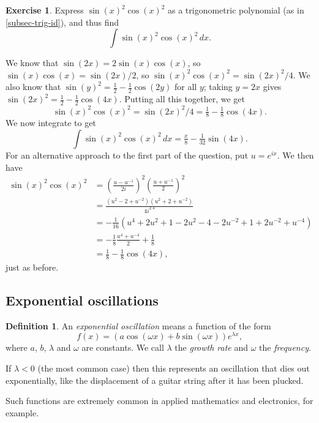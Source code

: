 \documentclass[a4paper]{book}
\newcommand{\PURPLE}[1]{{\color{purple}#1}}
\newcommand{\lm}        {\lambda}
\newcommand{\om}        {\omega}
\renewcommand{\:}{\colon}
\newcommand{\DEFN}[1]{\PURPLE{\emph{#1}}}
\theoremstyle{definition}
\newtheorem{definition}[theorem]{Definition}
\newtheorem{exercise}[theorem]{Exercise}
\renewenvironment{solution}{\SolutionInline}{\endSolutionInline}
\begin{document}
\begin{exercise}
 Express $\sin(x)^2\cos(x)^2$ as a trigonometric polynomial (as in
 \autoref{subsec-trig-id}), and thus find
 \[ \int \sin(x)^2 \cos(x)^2 \, dx. \]
\end{exercise}
\begin{solution}
 We know that $\sin(2x)=2\sin(x)\cos(x)$, so
 $\sin(x)\cos(x)=\sin(2x)/2$, so $\sin(x)^2\cos(x)^2=\sin(2x)^2/4$.
 We also know that $\sin(y)^2=\frac{1}{2}-\frac{1}{2}\cos(2y)$ for all
 $y$; taking $y=2x$ gives
 $\sin(2x)^2=\frac{1}{2}-\frac{1}{2}\cos(4x)$.  Putting all this
 together, we get
 \[ \sin(x)^2\cos(x)^2=\sin(2x)^2/4 = 
     \tfrac{1}{8}-\tfrac{1}{8}\cos(4x).
 \]
 We now integrate to get 
 \[ \int \sin(x)^2\cos(x)^2 \, dx =
     \tfrac{x}{8}-\tfrac{1}{32}\sin(4x).
 \]
 For an alternative approach to the first part of the question, put
 $u=e^{ix}$.  We then have
 \begin{align*}
  \sin(x)^2\cos(x)^2 &= \left(\frac{u-u^{-1}}{2i}\right)^2 
                         \left(\frac{u+u^{-1}}{2}\right)^2 \\
   &= \frac{(u^2-2+u^{-2})(u^2+2+u^{-2})}{4i^2.4} \\
   &= -\tfrac{1}{16}(u^4+2u^2+1-2u^2-4-2u^{-2}+1+2u^{-2}+u^{-4}) \\
   &= -\tfrac{1}{8}\frac{u^4+u^{-4}}{2} + \tfrac{1}{8} \\
   &= \tfrac{1}{8} - \tfrac{1}{8}\cos(4x),
 \end{align*}
 just as before.
\end{solution}

\subsection{Exponential oscillations}

\begin{definition}
 An \DEFN{exponential oscillation} means a function of the form
 \[ f(x) = (a\cos(\om x) + b\sin(\om x)) e^{\lm x}, \]
 where $a$, $b$, $\lm$ and $\om$ are constants.  We call $\lm$ the
 \DEFN{growth rate} and $\om$ the \DEFN{frequency}. 
\end{definition}
If $\lm<0$ (the most common case) then this represents an oscillation
that dies out exponentially, like the displacement of a guitar string
after it has been plucked.
\begin{center}
\end{center}
Such functions are extremely common in applied mathematics and
electronics, for example.
\end{document}
